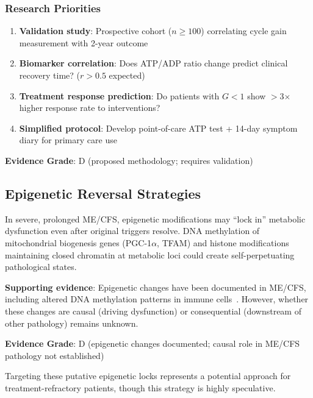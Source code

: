 \subsubsection{Research Priorities}

\begin{enumerate}
    \item \textbf{Validation study}: Prospective cohort ($n \geq 100$) correlating cycle gain measurement with 2-year outcome
    \item \textbf{Biomarker correlation}: Does ATP/ADP ratio change predict clinical recovery time? ($r > 0.5$ expected)
    \item \textbf{Treatment response prediction}: Do patients with $G < 1$ show $>$3$\times$ higher response rate to interventions?
    \item \textbf{Simplified protocol}: Develop point-of-care ATP test + 14-day symptom diary for primary care use
\end{enumerate}

\textbf{Evidence Grade}: D (proposed methodology; requires validation)

\subsection{Epigenetic Reversal Strategies}
\label{subsec:epigenetic-reversal}

\begin{hypothesis}
In severe, prolonged ME/CFS, epigenetic modifications may ``lock in'' metabolic dysfunction even after original triggers resolve. DNA methylation of mitochondrial biogenesis genes (PGC-1$\alpha$, TFAM) and histone modifications maintaining closed chromatin at metabolic loci could create self-perpetuating pathological states.

\textbf{Supporting evidence}: Epigenetic changes have been documented in ME/CFS, including altered DNA methylation patterns in immune cells~\cite{deVega2014mecfs_methylation}. However, whether these changes are causal (driving dysfunction) or consequential (downstream of other pathology) remains unknown.

\textbf{Evidence Grade}: D (epigenetic changes documented; causal role in ME/CFS pathology not established)
\end{hypothesis}

Targeting these putative epigenetic locks represents a potential approach for treatment-refractory patients, though this strategy is highly speculative.

